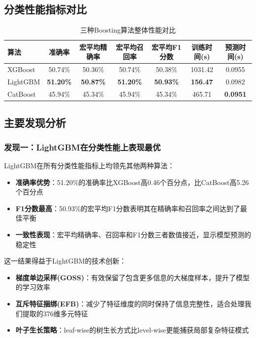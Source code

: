 \documentclass[UTF8]{report}
\theoremstyle{MyLineTheoremStyle} %
\theoremstyle{MyBlockTheoremStyle} %
\theoremstyle{MySubsubsectionStyle} %
\begin{document}
\subsection{分类性能指标对比}
\begin{table}[H]
    \centering
    \caption{三种Boosting算法整体性能对比}
    \begin{tabular}{lcccccc}
        \toprule
        算法 & 准确率 & 宏平均精确率 & 宏平均召回率 & 宏平均F1分数 & 训练时间(s) & 预测时间(s) \\
        \midrule
        XGBoost & 50.74\% & 50.36\% & 50.74\% & 50.38\% & 1031.42 & 0.0955 \\
        LightGBM & \textbf{51.20\%} & \textbf{50.87\%} & \textbf{51.20\%} & \textbf{50.93\%} & \textbf{156.47} & 0.0982 \\
        CatBoost & 45.94\% & 45.34\% & 45.94\% & 45.34\% & 465.71 & \textbf{0.0951} \\
        \bottomrule
    \end{tabular}
\end{table}

\subsection{主要发现分析}
\subsubsection{发现一：LightGBM在分类性能上表现最优}
LightGBM在所有分类性能指标上均领先其他两种算法：
\begin{itemize}
    \item \textbf{准确率优势}：51.20\%的准确率比XGBoost高0.46个百分点，比CatBoost高5.26个百分点
    \item \textbf{F1分数最高}：50.93\%的宏平均F1分数表明其在精确率和召回率之间达到了最佳平衡
    \item \textbf{一致性表现}：宏平均精确率、召回率和F1分数三者数值接近，显示模型预测的稳定性
\end{itemize}
这一结果得益于LightGBM的技术创新：
\begin{itemize}
    \item \textbf{梯度单边采样(GOSS)}：有效保留了包含更多信息的大梯度样本，提升了模型的学习效率
    \item \textbf{互斥特征捆绑(EFB)}：减少了特征维度的同时保持了信息完整性，适合处理我们提取的376维多元特征
    \item \textbf{叶子生长策略}：leaf-wise的树生长方式比level-wise更能捕获局部复杂特征模式
\end{itemize}
\end{document}
